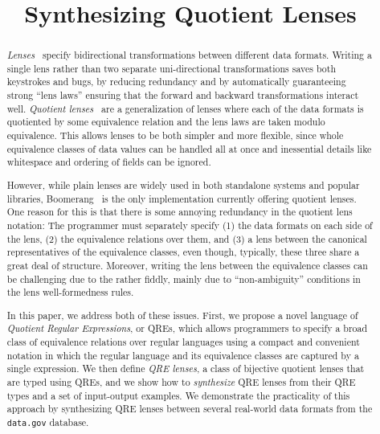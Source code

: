 \documentclass{svproc}
\begin{document}
\mainmatter              %
%
\title{Synthesizing Quotient Lenses}
%
%
\author{}
%
\authorrunning{} %
%
\tocauthor{}
%
\institute{}

\maketitle              %

\begin{abstract} 

{\em Lenses}~\cite{Lenses} specify bidirectional 
transformations between different data formats.  Writing a single lens
rather than two separate uni-directional transformations saves both
keystrokes and bugs, by reducing redundancy and by automatically
guaranteeing strong ``lens laws'' ensuring that the forward and backward
transformations interact well.  
%
{\em Quotient lenses}~\cite{quotientlenses} are a generalization of lenses
where each of the data formats is quotiented by some equivalence relation
and the lens laws are taken modulo equivalence.  This allows lenses to be
both simpler and more flexible, since whole equivalence classes of data
values can be handled all at once and inessential details like whitespace
and ordering of fields can be ignored.

\smallskip

However, while plain lenses are widely used in both standalone systems and
popular libraries, Boomerang~\cite{Boomerang} is the only implementation
currently offering quotient lenses.  One reason for this is that there is
some annoying redundancy in the quotient lens notation: The programmer must
separately specify (1) the data formats on each side of the lens, (2) the
equivalence relations over them, and (3) a lens between the canonical
representatives of the equivalence classes, even though, typically, these
three share a great deal of structure.  Moreover, writing the lens between
the equivalence classes can be challenging due to the rather fiddly, mainly
due to ``non-ambiguity'' conditions in the lens well-formedness rules.

\smallskip

In this paper, we address both of these issues.  First, we propose a novel
language of {\em Quotient Regular Expressions}, or QREs, which allows
programmers to specify a broad class of equivalence relations over regular
languages using a compact and convenient notation in which the regular
language and its equivalence classes are captured by a single expression.
We then define {\em QRE lenses}, a class of bijective quotient lenses that
are typed using QREs, and we show how to {\em synthesize} QRE lenses from their
QRE types and a set of input-output examples.  We demonstrate the
practicality of this approach by synthesizing QRE lenses between several
real-world data formats from the {\tt data.gov} database.
\end{abstract}
\end{document}
